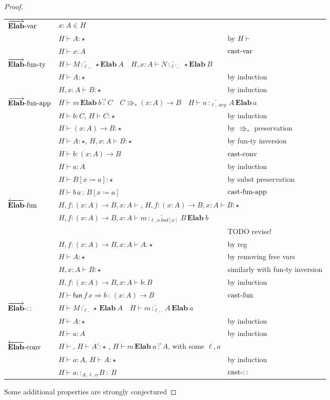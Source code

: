 \begin{proof}
\begin{tabular}{lll}
$\operatorname{\overrightarrow{\textbf{Elab}}-var}$ & $x:A\in H$ & \tabularnewline
& $H\vdash A:\star$ & by $H\vdash$\tabularnewline
& $H\vdash x:A$ & $\operatorname{cast-var}$\tabularnewline
$\operatorname{\overrightarrow{\textbf{Elab}}-fun-ty}$ & \multicolumn{2}{l}{$H\vdash M\overleftarrow{\,:_{\ell,.}\,}\star\textbf{Elab}\ A\quad H,x:A\vdash N\overleftarrow{\,:_{\ell',.}\,}\star\textbf{Elab}\ B$}\tabularnewline
& $H\vdash A:\star$ & by induction\tabularnewline
& $H,x:A\vdash B:\star$ & by induction\tabularnewline
$\operatorname{\overrightarrow{\textbf{Elab}}-fun-app}$ & \multicolumn{2}{l}{$H\vdash m\,\textbf{Elab}\ b\overrightarrow{\,:\,}C\quad C\Rrightarrow_{\ast}\left(x:A\right)\rightarrow B\quad H\vdash n\overleftarrow{\,:_{\ell,.arg}\,}A\,\textbf{Elab}\,a$}\tabularnewline
& $H\vdash b:C$, $H\vdash C:\star$ & by induction\tabularnewline
& $H\vdash\left(x:A\right)\rightarrow B:\star$ & by $\Rrightarrow_{\ast}$ preservation\tabularnewline
& $H\vdash A:\star$, $H,x:A\vdash B:\star$ & by fun-ty inversion\tabularnewline
& $H\vdash b:\left(x:A\right)\rightarrow B$ & $\operatorname{cast-conv}$\tabularnewline
& $H\vdash a:A$ & by induction\tabularnewline
& $H\vdash B\left[x\coloneqq a\right]:\star$ & by subst preservation\tabularnewline
& $H\vdash b\,a\,:\,B\left[x\coloneqq a\right]$ & $\operatorname{cast-fun-app}$\tabularnewline
$\operatorname{\overleftarrow{\textbf{Elab}}-fun}$ & \multicolumn{2}{l}{$H,f:\left(x:A\right)\rightarrow B,x:A\vdash$, $H,f:\left(x:A\right)\rightarrow B,x:A\vdash B:\star$}\tabularnewline
& $H,f:\left(x:A\right)\rightarrow B,x:A\vdash m\overleftarrow{\,:_{\ell,o.bod[x]}\,}B\,\textbf{Elab}\ b$ & \tabularnewline
&  & TODO revise!\tabularnewline
& $H,f:\left(x:A\right)\rightarrow B,x:A\vdash A:\star$ & by reg\tabularnewline
& $H\vdash A:\star$ & by removing free vars\tabularnewline
& $H,x:A\vdash B:\star$ & similarly with fun-ty inversion\tabularnewline
& $H,f:\left(x:A\right)\rightarrow B,x:A\vdash b:B$ & by induction\tabularnewline
& $H\vdash\mathsf{fun}\,f\,x\Rightarrow b\,:\,\left(x:A\right)\rightarrow B$ & $\operatorname{cast-fun}$\tabularnewline
$\operatorname{\overrightarrow{\textbf{Elab}}-::}$ & \multicolumn{2}{l}{$H\vdash M\overleftarrow{\,:_{\ell.}\,}\star\,\textbf{Elab}\ A\quad H\vdash m\overleftarrow{\,:_{\ell,.}\,}A\,\textbf{Elab}\ a$}\tabularnewline
& $H\vdash A:\star$ & by induction\tabularnewline
& $H\vdash a:A$ & by induction\tabularnewline
$\operatorname{\overleftarrow{\textbf{Elab}}-conv}$ & $H\vdash$, $H\vdash A':\star$ , $H\vdash m\,\textbf{Elab}\ a\overrightarrow{\,:\,}A$,
with some $\ell,o$ & \tabularnewline
& $H\vdash a:A$, $H\vdash A:\star$ & by induction\tabularnewline
& $H\vdash a::_{A,\ensuremath{\ell},o}B\::\:B$ & $\operatorname{cast-::}$\tabularnewline
\end{tabular}
 
Some additional properties are strongly conjectured
\end{proof}
